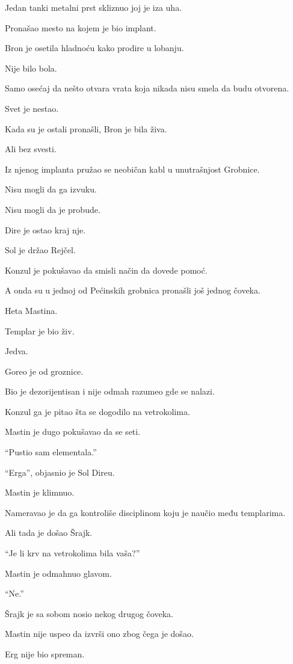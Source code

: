 Jedan tanki metalni prst skliznuo joj je iza uha.

Pronašao mesto na kojem je bio implant.

Bron je osetila hladnoću kako prodire u lobanju.

Nije bilo bola.

Samo osećaj da nešto otvara vrata koja nikada nisu smela da budu otvorena.

Svet je nestao.

\bigskip

Kada su je ostali pronašli, Bron je bila živa.

Ali bez svesti.

Iz njenog implanta pružao se neobičan kabl u unutrašnjost Grobnice.

Nisu mogli da ga izvuku.

Nisu mogli da je probude.

Dire je ostao kraj nje.

Sol je držao Rejčel.

Konzul je pokušavao da smisli način da dovede pomoć.

A onda su u jednoj od Pećinskih grobnica pronašli još jednog čoveka.

Heta Mastina.

\bigskip

Templar je bio živ.

Jedva.

Goreo je od groznice.

Bio je dezorijentisan i nije odmah razumeo gde se nalazi.

Konzul ga je pitao šta se dogodilo na vetrokolima.

Mastin je dugo pokušavao da se seti.

``Pustio sam elementala.''

``Erga'', objasnio je Sol Direu.

Mastin je klimnuo.

Nameravao je da ga kontroliše disciplinom koju je naučio među templarima.

Ali tada je došao Šrajk.

``Je li krv na vetrokolima bila vaša?''

Mastin je odmahnuo glavom.

``Ne.''

Šrajk je sa sobom nosio nekog drugog čoveka.

Mastin nije uspeo da izvrši ono zbog čega je došao.

Erg nije bio spreman.

